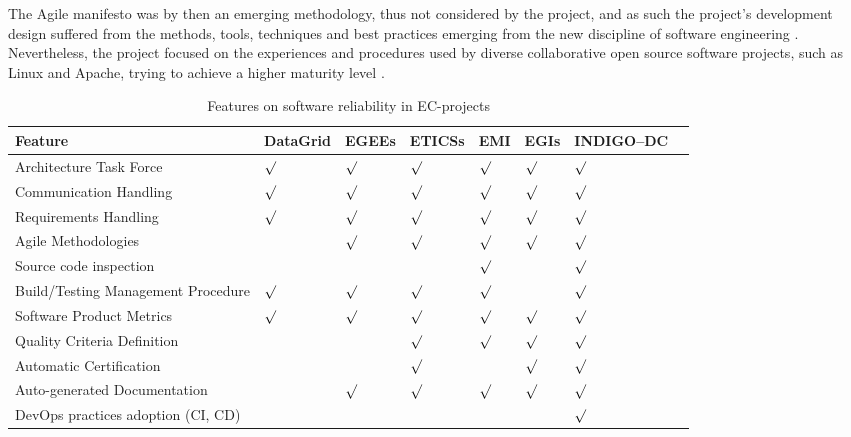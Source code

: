 \documentclass[journal]{IEEEtran}
\begin{document}
The Agile manifesto \cite{agile-manifesto} was by then an emerging methodology, thus not
considered by the project, and as such the project's
development design suffered from the methods, tools, techniques and best
practices emerging from the new discipline of software engineering
\cite{agile}. Nevertheless, the project focused on the experiences and procedures
used by diverse collaborative open source software projects, such as Linux and Apache, trying to
achieve a higher maturity level \cite{cmm}.

\begin{table}[!h]
\renewcommand{\arraystretch}{1.3}
\caption{Features on software reliability in EC-projects}
\label{tab:feat}
\centering
\begin{adjustbox}{max width=0.5\textwidth}
\begin{tabular}{llllllll}
\hline
\hline
Feature & DataGrid & EGEEs & ETICSs & EMI & EGIs & INDIGO--DC\\
\hline
\hline
Architecture Task Force&$\surd$&$\surd$&$\surd$&$\surd$&$\surd$&$\surd$\\
Communication Handling&$\surd$&$\surd$&$\surd$&$\surd$&$\surd$&$\surd$\\
Requirements Handling&$\surd$&$\surd$&$\surd$&$\surd$&$\surd$&$\surd$\\
Agile Methodologies&&$\surd$&$\surd$&$\surd$&$\surd$&$\surd$\\
Source code inspection&&&&$\surd$&&$\surd$\\
Build/Testing Management Procedure&$\surd$&$\surd$&$\surd$&$\surd$&&$\surd$\\
Software Product Metrics&$\surd$&$\surd$&$\surd$&$\surd$&$\surd$&$\surd$\\
Quality Criteria Definition&&&$\surd$&$\surd$&$\surd$&$\surd$\\
Automatic Certification&&&$\surd$&&$\surd$&$\surd$\\
Auto-generated Documentation&&$\surd$&$\surd$&$\surd$&$\surd$&$\surd$\\
DevOps practices adoption (CI, CD)&&&&&&$\surd$\\
\hline
\hline
\end{tabular}
\end{adjustbox}
\end{table}
\end{document}
